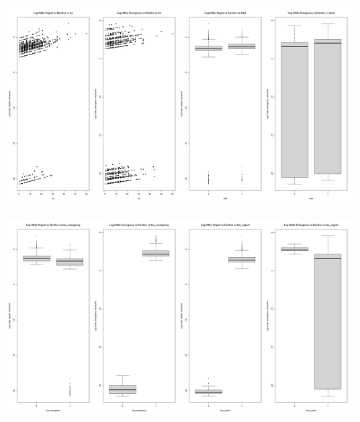 \documentclass[11pt]{article}
\begin{document}
\begin{figure}[ht]
    \centering
    \begin{subfigure}[b]{0.45\textwidth}
        \centering
        \includegraphics[width=\textwidth]{img/log_odds_1.png}
    \end{subfigure}
    \hfill
    \begin{subfigure}[b]{0.45\textwidth}
        \centering
        \includegraphics[width=\textwidth]{img/log_odds_2.png}
    \end{subfigure}

    \vspace{0.5cm}


\end{figure}
\end{document}
